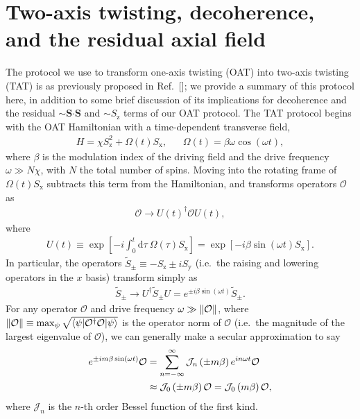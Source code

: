 \documentclass[aps,prx,superscriptaddress,notitlepage,twocolumn,longbibliography]{revtex4-2}
\newcommand{\p}[1]{\left(#1\right)} %
\renewcommand{\sp}[1]{\left[#1\right]} %
\renewcommand{\c}{\cdot} %
\renewcommand{\d}{\text{d}} %
\renewcommand{\v}{\bm} %
\newcommand{\J}{\mathcal{J}}
\renewcommand{\O}{\mathcal{O}}
\newcommand{\z}{\text{z}}
\newcommand{\x}{\text{x}}
\newcommand{\y}{\text{y}}
\begin{document}
\section{Two-axis twisting, decoherence, and the residual axial field}
\label{sec:derivation_TAT}

The protocol we use to transform one-axis twisting (OAT) into two-axis twisting (TAT) is as previously proposed in Ref.~[]; we provide a summary of this protocol here, in addition to some brief discussion of its implications for decoherence and the residual $\sim\v S\v\c\v S$ and $\sim S_\z$ terms of our OAT protocol.
The TAT protocol begins with the OAT Hamiltonian with a time-dependent transverse field,
\begin{align}
  H = \chi S_\z^2 + \Omega\p{t} S_\x,
  &&
  \Omega\p{t} = \beta\omega \cos\p{\omega t},
  \label{eq:driven_OAT}
\end{align}
where $\beta$ is the modulation index of the driving field and the drive frequency $\omega\gg N\chi$, with $N$ the total number of spins.
Moving into the rotating frame of $\Omega\p{t}S_\x$ subtracts this term from the Hamiltonian, and transforms operators $\O$ as
\begin{align}
  \O \to U\p{t}^\dag \O U\p{t},
\end{align}
where
\begin{align}
  U\p{t} \equiv \exp\sp{-i\int_0^t\d\tau~\Omega\p{\tau}S_\x}
  = \exp\sp{-i\beta\sin\p{\omega t}S_\x}.
\end{align}
In particular, the operators $\tilde S_\pm\equiv-S_\z\pm iS_\y$ (i.e.~the raising and lowering operators in the $x$ basis) transform simply as
\begin{align}
  \tilde S_\pm
  \to U^\dag \tilde S_\pm U
  = e^{\pm i\beta\sin\p{\omega t}} \tilde S_\pm.
\end{align}
For any operator $\O$ and drive frequency $\omega\gg\norm{\O}$, where $\norm{\O}\equiv\max_\psi\sqrt{\braket{\psi|\O^\dag\O|\psi}}$ is the operator norm of $\O$ (i.e.~the magnitude of the largest eigenvalue of $\O$), we can generally make a secular approximation to say
\begin{align}
  e^{\pm im\beta\sin\p{\omega t}} \O
  &= \sum_{n=-\infty}^\infty \J_n\p{\pm m\beta} e^{in\omega t} \O \notag \\
  &\approx \J_0\p{\pm m\beta} \O
  = \J_0\p{m\beta} \O,
\end{align}
where $\J_n$ is the $n$-th order Bessel function of the first kind.
\end{document}
